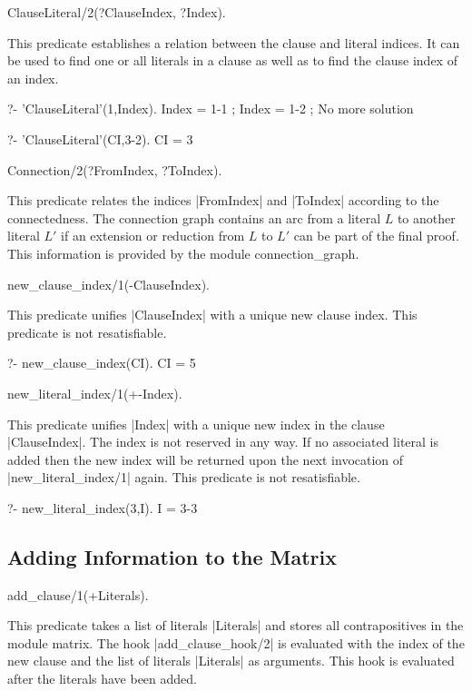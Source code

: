 \Predicate ClauseLiteral/2(?ClauseIndex, ?Index).

This predicate establishes a relation between the clause and literal indices.
It can be used to find one or all literals in a clause as well as to find the
clause index of an index.

\begin{BoxedSample}
  ?- 'ClauseLiteral'(1,Index).
  Index = 1-1
  ;
  Index = 1-2
  ;
  No more solution

  ?- 'ClauseLiteral'(CI,3-2).
  CI = 3
\end{BoxedSample}


\Predicate Connection/2(?FromIndex, ?ToIndex).

This predicate relates the indices |FromIndex| and |ToIndex| according to the
connectedness. The connection graph contains an arc from a literal $L$\/ to
another literal $L'$\/ if an extension or reduction from $L$\/ to $L'$\/ can
be part of the final proof. This information is provided by the module {\sf
  connection\_graph}. 


\Predicate new_clause_index/1(-ClauseIndex).

This predicate unifies |ClauseIndex| with a unique new clause index. This
predicate is not resatisfiable.
\begin{BoxedSample}
  ?- new\_clause\_index(CI).
  CI = 5
\end{BoxedSample}


\Predicate new_literal_index/1(+-Index).

This predicate unifies |Index| with a unique new index in the clause
|ClauseIndex|. The index is not reserved in any way. If no associated literal
is added then the new index will be returned upon the next invocation of
|new_literal_index/1| again. This predicate is not resatisfiable.
\begin{BoxedSample}
  ?- new\_literal\_index(3,I).
  I = 3-3
\end{BoxedSample}


\subsection{Adding Information to the Matrix}

\Predicate add_clause/1(+Literals).

This predicate takes a list of literals |Literals| and stores all
contrapositives in the module {\sf matrix}. The hook |add_clause_hook/2| is
evaluated with the index of the new clause and the list of literals |Literals|
as arguments. This hook is evaluated after the literals have been added.

